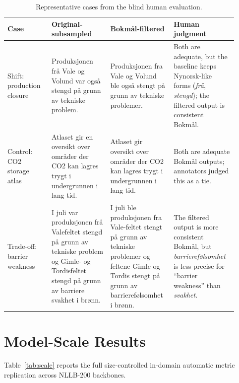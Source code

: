 \documentclass[11pt]{article}
\newcommand{\nb}{Bokm{\aa}l}
\newcommand{\nn}{Nynorsk}
\begin{document}
\begin{table}[h]
\centering
\small
\begin{tabular}{p{0.18\linewidth}p{0.24\linewidth}p{0.24\linewidth}p{0.26\linewidth}}
\toprule
Case & Original-subsampled & \nb{}-filtered & Human judgment \\
\midrule
Shift: production closure
& Produksjonen frå Vale og Volund var også stengd på grunn av tekniske problem.
& Produksjonen fra Vale og Volund ble også stengt på grunn av tekniske problemer.
& Both are adequate, but the baseline keeps \nn{}-like forms (\emph{frå}, \emph{stengd}); the filtered output is consistent \nb{}. \\
\midrule
Control: CO2 storage atlas
& Atlaset gir en oversikt over områder der CO2 kan lagres trygt i undergrunnen i lang tid.
& Atlaset gir oversikt over områder der CO2 kan lagres trygt i undergrunnen i lang tid.
& Both are adequate \nb{} outputs; annotators judged this as a tie. \\
\midrule
Trade-off: barrier weakness
& I juli var produksjonen frå Valefeltet stengd på grunn av tekniske problem og Gimle- og Tordisfeltet stengd på grunn av barriere svakhet i brønn.
& I juli ble produksjonen fra Vale-feltet stengt på grunn av tekniske problemer og feltene Gimle og Tordis stengt på grunn av barrierefølsomhet i brønn.
& The filtered output is more consistent \nb{}, but \emph{barrierefølsomhet} is less precise for ``barrier weakness'' than \emph{svakhet}. \\
\bottomrule
\end{tabular}
\caption{Representative cases from the blind human evaluation.}
\label{tab:examples}
\end{table}

\section{Model-Scale Results}
\label{app:model-scale-results}

Table~\ref{tab:scale} reports the full size-controlled in-domain automatic metric replication across NLLB-200 backbones.
\end{document}
